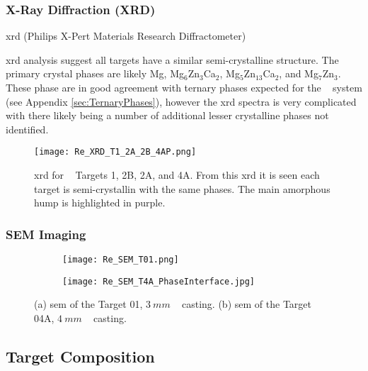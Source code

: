 \documentclass[a4paper,12pt,oneside]{report}%
\begin{document}
\subsubsection{X-Ray Diffraction (XRD)}
\gls{xrd} (Philips X-Pert Materials Research Diffractometer)

\gls{xrd} analysis suggest all targets have a similar semi-crystalline structure. The primary crystal phases are likely Mg, Mg$_{6}$Zn$_{3}$Ca$_{2}$, Mg$_{5}$Zn$_{13}$Ca$_{2}$, and Mg$_{7}$Zn$_{3}$. These phase are in good agreement with ternary phases expected for the \MgZnCa~ system (see Appendix \ref{sec:TernaryPhases}), however the \gls{xrd} spectra is very complicated with there likely being a number of additional lesser crystalline phases not identified. 

\begin{figure}[htbp]
	\centering
	\texttt{[image: Re\_XRD\_T1\_2A\_2B\_4AP.png]}
	\caption{\acrshort{xrd} for \MgZnCa~ Targets 1, 2B, 2A, and 4A. From this \acrshort{xrd} it is seen each target is semi-crystallin with the same phases. The main amorphous hump is highlighted in purple.}
	\label{fig:XRD_T1_2_4}
\end{figure}

\subsubsection{SEM Imaging}

\begin{figure}[htbp]
	\centering
	\begin{subfigure}[htbp]{0.51\textwidth}
		\texttt{[image: Re\_SEM\_T01.png]}
		\caption{}
		\label{fig:SEMT01}
	\end{subfigure}
	\begin{subfigure}[htbp]{0.47\textwidth}
		\texttt{[image: Re\_SEM\_T4A\_PhaseInterface.jpg]}
		\caption{}
		\label{fig:SEMT04A}
	\end{subfigure}
	\caption{(a) \acrshort{sem} of the Target 01, $3~ mm$ \MgZnCa~ casting. (b) \acrshort{sem} of the Target 04A, $4~ mm$ \MgZnCa~ casting.}%
	\label{fig:SEMT0104A}
\end{figure}

\subsection{Target Composition}
\end{document}
